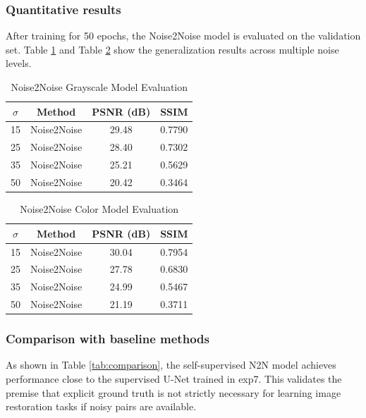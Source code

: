 \documentclass[conference]{IEEEtran}
\begin{document}
\subsubsection{Quantitative results}
After training for 50 epochs, the Noise2Noise model is evaluated on the validation set. Table \ref{tab:gray} and Table \ref{tab:color} show the generalization results across multiple noise levels.

\begin{table}[htbp]
\caption{Noise2Noise Grayscale Model Evaluation}
\begin{center}
\begin{tabular}{cccc}
\toprule
\textbf{$\sigma$} & \textbf{Method} & \textbf{PSNR (dB)} & \textbf{SSIM} \\
\midrule
15 & Noise2Noise & 29.48 & 0.7790 \\
25 & Noise2Noise & 28.40 & 0.7302 \\
35 & Noise2Noise & 25.21 & 0.5629 \\
50 & Noise2Noise & 20.42 & 0.3464 \\
\bottomrule
\end{tabular}
\label{tab:gray}
\end{center}
\end{table}

\begin{table}[htbp]
\caption{Noise2Noise Color Model Evaluation}
\begin{center}
\begin{tabular}{cccc}
\toprule
\textbf{$\sigma$} & \textbf{Method} & \textbf{PSNR (dB)} & \textbf{SSIM} \\
\midrule
15 & Noise2Noise & 30.04 & 0.7954 \\
25 & Noise2Noise & 27.78 & 0.6830 \\
35 & Noise2Noise & 24.99 & 0.5467 \\
50 & Noise2Noise & 21.19 & 0.3711 \\
\bottomrule
\end{tabular}
\label{tab:color}
\end{center}
\end{table}

\subsubsection{Comparison with baseline methods}
As shown in Table \ref{tab:comparison}, the self-supervised N2N model achieves performance close to the supervised U-Net trained in exp7. This validates the premise that explicit ground truth is not strictly necessary for learning image restoration tasks if noisy pairs are available.
\end{document}
